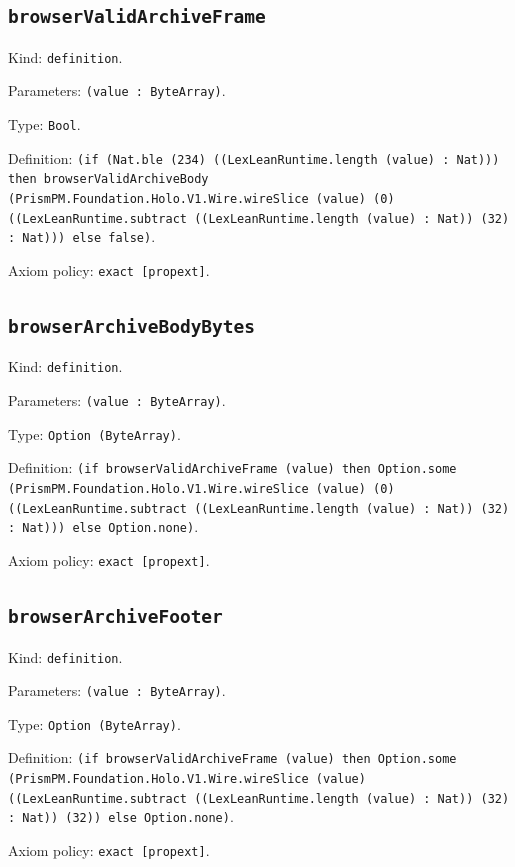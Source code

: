 \documentclass[11pt]{article}
\begin{document}
\subsection*{\texttt{browserValidArchiveFrame}}
\noindent Kind: \texttt{definition}.\par
\noindent Parameters: \texttt{(value : ByteArray)}.\par
\noindent Type: \texttt{Bool}.\par
\noindent Definition: \texttt{(if (Nat.ble (234) ((LexLeanRuntime.length (value) : Nat))) then browserValidArchiveBody (PrismPM.Foundation.Holo.V1.Wire.wireSlice (value) (0) ((LexLeanRuntime.subtract ((LexLeanRuntime.length (value) : Nat)) (32) : Nat))) else false)}.\par
\noindent Axiom policy: \texttt{exact [propext]}.\par
\subsection*{\texttt{browserArchiveBodyBytes}}
\noindent Kind: \texttt{definition}.\par
\noindent Parameters: \texttt{(value : ByteArray)}.\par
\noindent Type: \texttt{Option (ByteArray)}.\par
\noindent Definition: \texttt{(if browserValidArchiveFrame (value) then Option.some (PrismPM.Foundation.Holo.V1.Wire.wireSlice (value) (0) ((LexLeanRuntime.subtract ((LexLeanRuntime.length (value) : Nat)) (32) : Nat))) else Option.none)}.\par
\noindent Axiom policy: \texttt{exact [propext]}.\par
\subsection*{\texttt{browserArchiveFooter}}
\noindent Kind: \texttt{definition}.\par
\noindent Parameters: \texttt{(value : ByteArray)}.\par
\noindent Type: \texttt{Option (ByteArray)}.\par
\noindent Definition: \texttt{(if browserValidArchiveFrame (value) then Option.some (PrismPM.Foundation.Holo.V1.Wire.wireSlice (value) ((LexLeanRuntime.subtract ((LexLeanRuntime.length (value) : Nat)) (32) : Nat)) (32)) else Option.none)}.\par
\noindent Axiom policy: \texttt{exact [propext]}.\par
\end{document}
